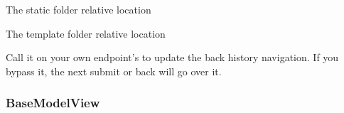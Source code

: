\documentclass[letterpaper,10pt,english]{sphinxmanual}
\begin{document}
\begin{fulllineitems}
\begin{fulllineitems}
\end{fulllineitems}


\begin{fulllineitems}
\label{api:flask.ext.appbuilder.baseviews.BaseView.static_folder}
The static folder relative location

\end{fulllineitems}


\begin{fulllineitems}
\label{api:flask.ext.appbuilder.baseviews.BaseView.template_folder}
The template folder relative location

\end{fulllineitems}


\begin{fulllineitems}
\label{api:flask.ext.appbuilder.baseviews.BaseView.update_redirect}
Call it on your own endpoint's to update the back history navigation.
If you bypass it, the next submit or back will go over it.

\end{fulllineitems}


\end{fulllineitems}



\subsubsection{BaseModelView}
\label{api:basemodelview}
\end{document}
